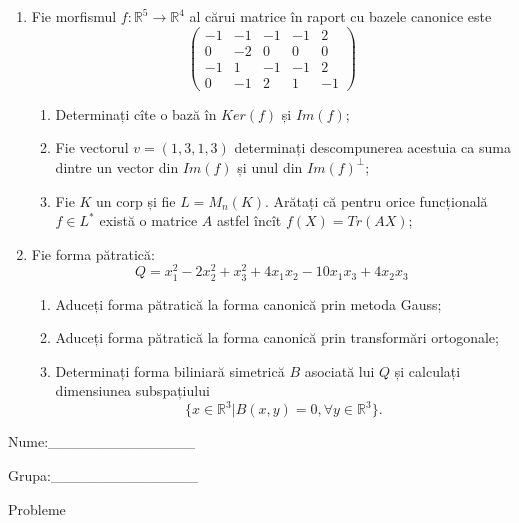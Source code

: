 \documentclass{article}
\begin{document}
\begin{enumerate}
 \item Fie morfismul $f:\mathbb{R}^5 \to \mathbb{R}^4$ al cărui matrice în raport cu bazele canonice este
$$\begin{pmatrix}
-1&-1&-1&-1&2\\
0&-2&0&0&0\\
-1&1&-1&-1&2\\
0&-1&2&1&-1
\end{pmatrix}$$

\begin{enumerate}
\item Determinați cîte o bază în $Ker(f)$ și $Im(f)$;
\item Fie vectorul $v=(1,3,1,3)$ determinați descompunerea acestuia ca suma dintre un vector din $Im(f)$ și unul din $Im(f)^\perp$;
\item Fie $K$ un corp și fie $L=M_n(K)$. Arătați că pentru orice funcțională $f \in L^*$ există o matrice $A$ astfel încît $f(X)=Tr(AX)$;
\end{enumerate}
\item Fie forma pătratică:
$$Q= x_1^2-2x_2^2+x_3^2+4x_1x_2-10x_1x_3+4x_2x_3$$

\begin{enumerate}
\item Aduceți forma pătratică la forma canonică prin metoda Gauss;
\item Aduceți forma pătratică la forma canonică prin transformări ortogonale;
\item Determinați forma biliniară simetrică $B$ asociată lui $Q$ și calculați dimensiunea subspațiului
$$\{x \in \mathbb{R}^3 | B(x,y)=0,\forall y \in \mathbb{R}^3\}.$$

\end{enumerate}
\end{enumerate}
\newpage
\begin{flushright}
Nume:\_\_\_\_\_\_\_\_\_\_\_\_\_\_
 
 
Grupa:\_\_\_\_\_\_\_\_\_\_\_\_\_\_
\end{flushright}
\begin{center}
\vspace{2cm}
{\Large Probleme}
\vspace{2cm}
\end{center}
\end{document}
